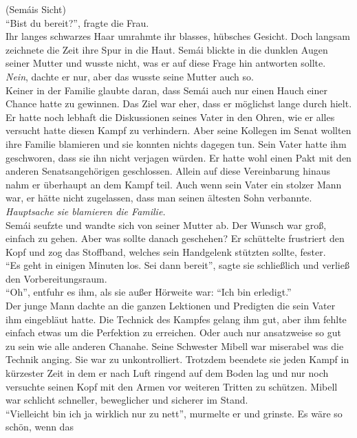 (Semáis Sicht)\\
``Bist du bereit?'', fragte die Frau. \\
Ihr langes schwarzes Haar umrahmte ihr blasses, hübsches Gesicht. Doch langsam zeichnete die Zeit 
ihre Spur in die Haut. Semái blickte in die dunklen Augen seiner Mutter und wusste nicht, was er 
auf 
diese Frage hin antworten sollte. \\
\textit{Nein}, dachte er nur, aber das wusste seine Mutter auch so.\\
Keiner in der Familie glaubte daran, dass Semái auch nur einen Hauch einer Chance hatte zu 
gewinnen. 
Das Ziel war eher, dass er möglichst lange durch hielt. Er hatte noch lebhaft die Diskussionen 
seines Vater in den Ohren, wie er alles versucht hatte diesen Kampf zu verhindern. Aber seine 
Kollegen im Senat wollten ihre Familie blamieren und sie konnten nichts dagegen tun. Sein Vater 
hatte ihm geschworen, dass sie ihn nicht verjagen würden. Er hatte wohl einen Pakt mit den anderen 
Senatsangehörigen geschlossen. Allein auf diese Vereinbarung hinaus nahm er überhaupt an dem Kampf 
teil. Auch wenn sein Vater ein stolzer Mann war, er hätte nicht zugelassen, dass man seinen 
ältesten Sohn verbannte. \\
\textit{Hauptsache sie blamieren die Familie.}\\
Semái seufzte und wandte sich von seiner Mutter ab. Der Wunsch war groß, einfach zu gehen. Aber was 
sollte danach geschehen? Er schüttelte frustriert den Kopf und zog das Stoffband, welches sein 
Handgelenk stützten sollte, fester. \\
``Es geht in einigen Minuten los. Sei dann bereit'', sagte sie schließlich und verließ den 
Vorbereitungsraum. \\
``Oh'', entfuhr es ihm, als sie außer Hörweite war: ``Ich bin erledigt.'' \\
Der junge Mann dachte an die ganzen Lektionen und Predigten die sein Vater ihm eingebläut hatte. 
Die 
Technick des Kampfes gelang ihm gut, aber ihm fehlte einfach etwas um die Perfektion zu erreichen. 
Oder auch nur ansatzweise so gut zu sein wie alle anderen Chanahe. Seine Schwester Mibell war 
miserabel was die Technik anging. Sie war zu unkontrolliert. Trotzdem beendete sie jeden Kampf in 
kürzester Zeit in dem er nach Luft ringend auf dem Boden lag und nur noch versuchte seinen Kopf mit 
den Armen vor weiteren Tritten zu schützen. Mibell war schlicht schneller, beweglicher und sicherer 
im Stand. \\
``Vielleicht bin ich ja wirklich nur zu nett'', murmelte er und grinste. Es wäre so schön, wenn das 
